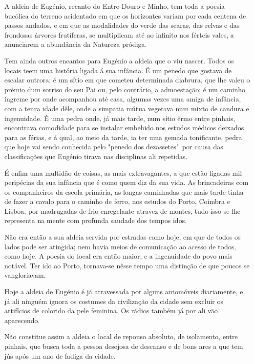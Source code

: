 \documentclass[9pt]{article}
\begin{document}
A aldeia de Eugé\-nio, recanto do Entre-Douro e Minho, tem toda a poesia
bucólica do terreno acidentado em que os horizontes variam por cada centena
de passos andados, e em que as modalidades do verde das searas, das relvas
e das frondosas árvores frutíferas, se multiplicam até ao infinito nos férteis vales, a anunciarem a abundância da Natureza pródiga.

Tem ainda outros encantos para Eugé\-nio a aldeia que o viu nascer. Todos os locais teem uma his\-tó\-ria ligada á sua infância. É um penedo que gostava de escalar outrora; é um sítio em que cometeu determinada diabrura,
que lhe valeu o prémio dum sorriso do seu Pai ou, pelo contrário, a admoesta\-ção; é um caminho íngreme por onde acompanhou até casa, algumas vezes
uma amiga de infância, com a tenra idade dêle, onde a simpatia mútua vegetava
num mixto de candura e ingenuidade. É uma pedra onde, já mais tarde, num sítio êrmo entre pinhais, encontrava comodidade para se instalar embebido nos
estudos médicos deixados para as férias, e á qual, ao meio da tarde, ia ter
uma gemada tonifi\-cante, pedra que hoje vai sendo conhecida pelo "penedo dos
dezassetes"\ por causa das classifi\-ca\-ções que Eugé\-nio tirava nas disciplinas ali repetidas.

É enfim uma multidão de coisas, as mais extravagantes, a que estão ligadas mil peripécias da sua infância que é como quem diz da sua vida. As
brincadeiras com os companheiros da escola primária, as longas caminhadas
que mais tarde tinha de fazer a cavalo para o caminho de ferro, nos estudos
do Porto, Coimbra e Lisboa, por madrugadas de frio enregelante atravez de montes, tudo isso se lhe representa na mente com profunda saudade dos tempos
idos.

Não era então a sua aldeia servida por estradas como hoje, em que de
todos os lados pode ser atingida; nem havia meios de comunica\-ção ao acesso
de todos, como hoje. A poesia do local era então maior, e a ingenuidade do
povo mais notável. Ter ido ao Porto, tornava-se nêsse tempo uma distin\-ção
de que poucos se vangloriavam.

Hoje a aldeia de Eugé\-nio é já atravessada por alguns automóveis diariamente, e já ali nin\-guém ignora os costumes da civiliza\-ção da cidade sem
excluir os artifícios de colorido da pele feminina. Os rádios também já por
ali vão aparecendo.

Não constitue assim a aldeia o local de repouso absoluto, de isolamento, entre pinhais, que busca toda a pessoa desejosa de descanso e de bons
ares a que tem jús após um ano de fadiga da cidade.
\end{document}
